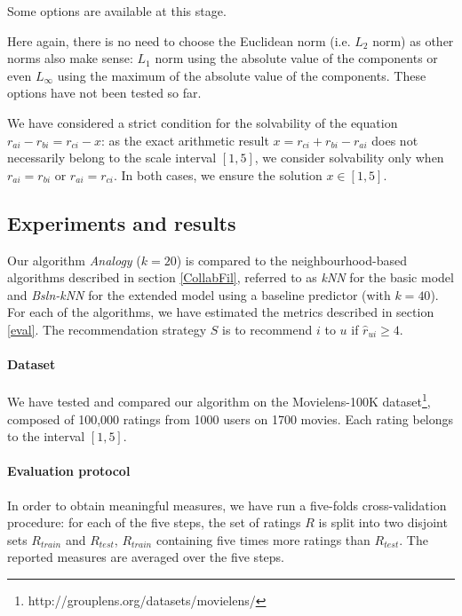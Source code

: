 Some options are available at this stage.

Here again, there is no need to choose the Euclidean norm (i.e. $L_2$ norm) as
other norms also make sense: $L_1$ norm using the absolute value of the
components or even $L_\infty$ using the maximum of the absolute value of the
components. These options have not been tested so far.

We have considered a strict condition for the solvability of the equation
$r_{ai} - r_{bi} = r_{ci} - x$: as the exact arithmetic result $x=r_{ci} +
r_{bi} -r_{ai}$ does not necessarily belong to the scale interval $[1,5]$, we
consider solvability only when $r_{ai}=r_{bi}$ or $r_{ai}=r_{ci}$. In both
cases, we ensure the solution $x \in [1,5]$.

\subsection{Experiments and results}
\label{results}

Our algorithm \textit{Analogy} ($k=20$) is compared to the neighbourhood-based algorithms
described in section \ref{CollabFil}, referred to as \textit{kNN} for the basic
model and \textit{Bsln-kNN} for the extended model using a baseline predictor
(with $k=40$). For each of the algorithms, we have estimated the metrics described
in section \ref{eval}. The recommendation strategy $S$ is to recommend $i$ to
$u$ if $\hat{r}_{ui} \geq 4$.

\paragraph{Dataset\\}
We have tested and compared our algorithm on the Movielens-100K
dataset\footnote{http://grouplens.org/datasets/movielens/}, composed of 100,000
ratings from 1000 users on 1700 movies. Each rating belongs to the interval
$[1, 5]$.

\paragraph{Evaluation protocol\\}
In order to obtain meaningful measures, we have run a five-folds
cross-validation procedure: for each of the five steps, the set of ratings $R$ is
split into two disjoint sets $R_{train}$ and $R_{test}$, $R_{train}$ containing
five times more ratings than $R_{test}$. The reported measures are averaged
over the five steps.

